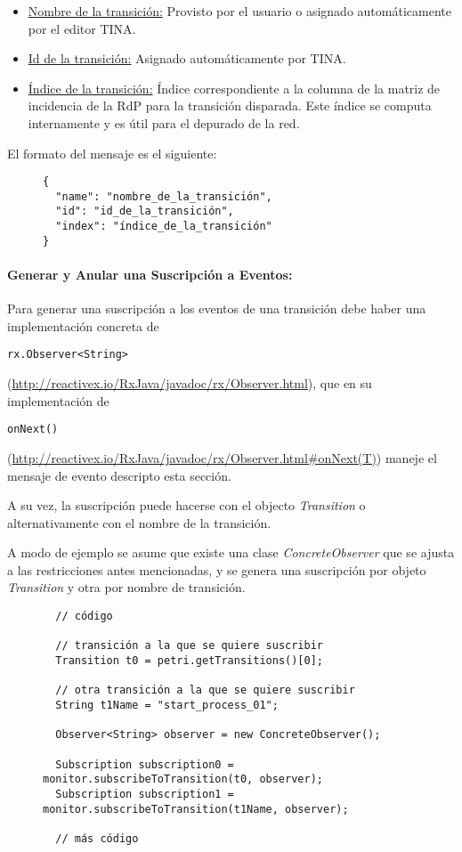 \begin{itemize}
    \item \underline{Nombre de la transición:} Provisto por el usuario o
    asignado automáticamente por el editor TINA.
    \item \underline{Id de la transición:} Asignado automáticamente por TINA.
    \item \underline{Índice de la transición:} Índice correspondiente a la
    columna de la matriz de incidencia de la RdP para la transición disparada.
    Este índice se computa internamente y es útil para el depurado de la red.
\end{itemize}

El formato del mensaje es el siguiente:

\begin{figure}[H]
\centering
\begin{verbatim}
{
  "name": "nombre_de_la_transición",
  "id": "id_de_la_transición",
  "index": "índice_de_la_transición"
}
\end{verbatim}
\end{figure}

\paragraph{Generar y Anular una Suscripción a Eventos:}
Para generar una suscripción a los eventos de una transición debe haber una
implementación concreta de
\begin{verbatim}
rx.Observer<String>
\end{verbatim} 
(\url{http://reactivex.io/RxJava/javadoc/rx/Observer.html}), que en su
implementación de
\begin{verbatim}
onNext()
\end{verbatim} 
(\url{http://reactivex.io/RxJava/javadoc/rx/Observer.html#onNext(T)})
maneje el mensaje de evento descripto esta sección.

A su vez, la suscripción puede hacerse con el objecto \textit{Transition} o
alternativamente con el nombre de la transición.

A modo de ejemplo se asume que existe una clase \textit{ConcreteObserver} que se
ajusta a las restricciones antes mencionadas, y se genera una suscripción por
objeto \textit{Transition} y otra por nombre de transición.

\begin{figure}[H]
\centering
\begin{verbatim}
  // código
  
  // transición a la que se quiere suscribir
  Transition t0 = petri.getTransitions()[0]; 
  
  // otra transición a la que se quiere suscribir
  String t1Name = "start_process_01";
  
  Observer<String> observer = new ConcreteObserver();
  
  Subscription subscription0 = monitor.subscribeToTransition(t0, observer);
  Subscription subscription1 = monitor.subscribeToTransition(t1Name, observer);
  
  // más código
\end{verbatim}
\end{figure}


